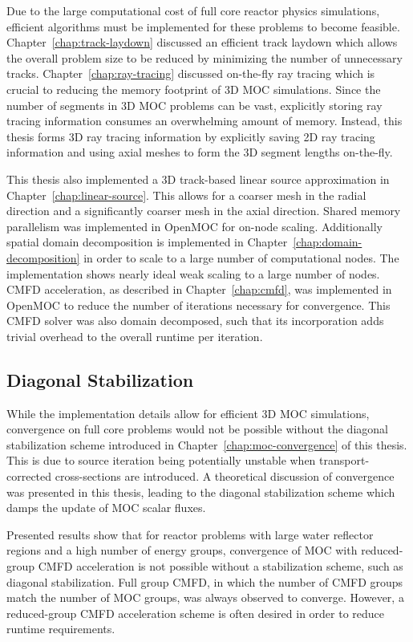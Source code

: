 Due to the large computational cost of full core reactor physics simulations, efficient algorithms must be implemented for these problems to become feasible. Chapter~\ref{chap:track-laydown} discussed an efficient track laydown which allows the overall problem size to be reduced by minimizing the number of unnecessary tracks. Chapter~\ref{chap:ray-tracing} discussed on-the-fly ray tracing which is crucial to reducing the memory footprint of 3D \ac{MOC} simulations. Since the number of segments in 3D \ac{MOC} problems can be vast, explicitly storing ray tracing information consumes an overwhelming amount of memory. Instead, this thesis forms 3D ray tracing information by explicitly saving 2D ray tracing information and using axial meshes to form the 3D segment lengths on-the-fly.

This thesis also implemented a 3D track-based linear source approximation in Chapter~\ref{chap:linear-source}. This allows for a coarser mesh in the radial direction and a significantly coarser mesh in the axial direction. Shared memory parallelism was implemented in OpenMOC for on-node scaling. Additionally spatial domain decomposition is implemented in Chapter~\ref{chap:domain-decomposition} in order to scale to a large number of computational nodes. The implementation shows nearly ideal weak scaling to a large number of nodes. \ac{CMFD} acceleration, as described in Chapter~\ref{chap:cmfd}, was implemented in OpenMOC to reduce the number of iterations necessary for convergence. This \ac{CMFD} solver was also domain decomposed, such that its incorporation adds trivial overhead to the overall runtime per iteration.


\subsection{Diagonal Stabilization}
\label{sec:sub:diag-stab}

While the implementation details allow for efficient 3D \ac{MOC} simulations, convergence on full core problems would not be possible without the diagonal stabilization scheme introduced in Chapter~\ref{chap:moc-convergence} of this thesis. This is due to source iteration being potentially unstable when transport-corrected cross-sections are introduced. A theoretical discussion of convergence was presented in this thesis, leading to the diagonal stabilization scheme which damps the update of \ac{MOC} scalar fluxes.

Presented results show that for reactor problems with large water reflector regions and a high number of energy groups, convergence of \ac{MOC} with reduced-group \ac{CMFD} acceleration is not possible without a stabilization scheme, such as diagonal stabilization. Full group \ac{CMFD}, in which the number of \ac{CMFD} groups match the number of \ac{MOC} groups, was always observed to converge. However, a reduced-group \ac{CMFD} acceleration scheme is often desired in order to reduce runtime requirements.

